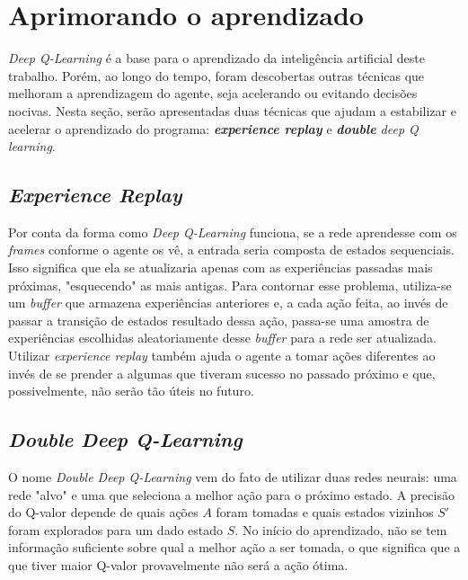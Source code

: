 
\section{Aprimorando o aprendizado}
\label{sec:enhance}

\textit{Deep Q-Learning} é a base para o aprendizado da inteligência artificial deste trabalho.
Porém, ao longo do tempo, foram descobertas outras técnicas que melhoram a aprendizagem do agente, seja acelerando ou evitando decisões nocivas.
Nesta seção, serão apresentadas
duas técnicas que ajudam a estabilizar e acelerar o aprendizado do programa:
\textit{\textbf{experience replay}}
e \textit{\textbf{double} deep Q learning}.

\subsection{\textit{Experience Replay}}
\label{sec:er}

Por conta da forma como \textit{Deep Q-Learning} funciona, se a rede aprendesse com os \textit{frames} conforme o agente os vê, a entrada seria composta de estados sequenciais.
Isso significa que ela se atualizaria apenas com as experiências passadas mais próximas, "esquecendo"{} as mais antigas.
Para contornar esse problema, utiliza-se um \textit{buffer} que armazena experiências anteriores e, a cada ação feita, ao invés de passar a transição de estados resultado dessa ação, passa-se uma amostra de experiências escolhidas aleatoriamente desse \textit{buffer} para a rede ser atualizada.
Utilizar \textit{experience replay} também ajuda o agente a tomar ações diferentes ao invés de se prender a algumas que tiveram sucesso no passado próximo e que, possivelmente, não serão tão úteis no futuro.

%

\subsection{\textit{Double Deep Q-Learning}}
\label{sec:ddql}

O nome \textit{Double Deep Q-Learning} vem do fato de utilizar duas redes neurais: uma rede "alvo"{} e uma que seleciona a melhor ação para o próximo estado.
A precisão do Q-valor depende de quais ações $A$ foram tomadas e quais estados vizinhos $S'$ foram explorados para um dado estado $S$.
No início do aprendizado, não se tem informação suficiente sobre qual a melhor ação a ser tomada, o que significa que a que tiver maior Q-valor provavelmente não será a ação ótima.


